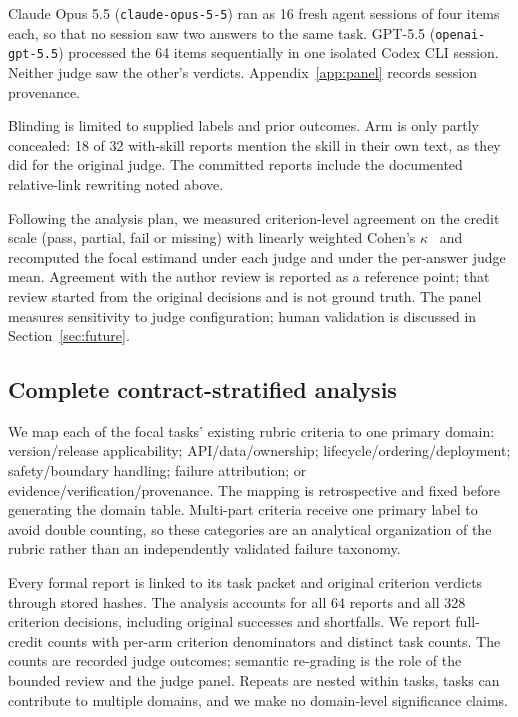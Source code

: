 \documentclass[11pt]{article}
\begin{document}
Claude Opus 5.5 (\texttt{claude-opus-5-5}) ran as 16 fresh agent sessions of four items each, so that no session saw two answers to the same task. GPT-5.5 (\texttt{openai-gpt-5.5}) processed the 64 items sequentially in one isolated Codex CLI session. Neither judge saw the other's verdicts. Appendix~\ref{app:panel} records session provenance.

Blinding is limited to supplied labels and prior outcomes. Arm is only partly concealed: 18 of 32 with-skill reports mention the skill in their own text, as they did for the original judge. The committed reports include the documented relative-link rewriting noted above.

Following the analysis plan, we measured criterion-level agreement on the credit scale (pass, partial, fail or missing) with linearly weighted Cohen's $\kappa$~\citep{cohen1960coefficient,cohen1968weighted} and recomputed the focal estimand under each judge and under the per-answer judge mean. Agreement with the author review is reported as a reference point; that review started from the original decisions and is not ground truth. The panel measures sensitivity to judge configuration; human validation is discussed in Section~\ref{sec:future}.

\subsection{Complete contract-stratified analysis}\label{sec:contracts}
We map each of the focal tasks' existing rubric criteria to one primary domain: version/release applicability; API/data/ownership; lifecycle/ordering/deployment; safety/boundary handling; failure attribution; or evidence/verification/provenance. The mapping is retrospective and fixed before generating the domain table. Multi-part criteria receive one primary label to avoid double counting, so these categories are an analytical organization of the rubric rather than an independently validated failure taxonomy.

Every formal report is linked to its task packet and original criterion verdicts through stored hashes. The analysis accounts for all 64 reports and all 328 criterion decisions, including original successes and shortfalls. We report full-credit counts with per-arm criterion denominators and distinct task counts. The counts are recorded judge outcomes; semantic re-grading is the role of the bounded review and the judge panel. Repeats are nested within tasks, tasks can contribute to multiple domains, and we make no domain-level significance claims.
\end{document}
